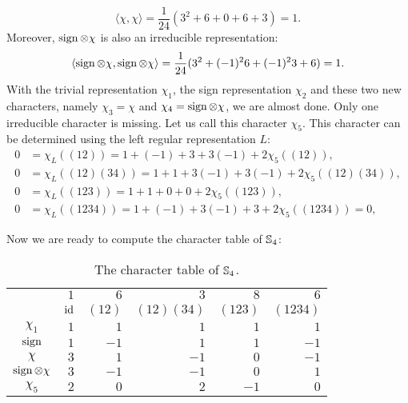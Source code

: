 \begin{example}
      \[
	 	\langle \chi,\chi\rangle=\frac{1}{24}(3^2+6+0+6+3)=1.
	 \]
     Moreover, $\operatorname{sign}\otimes\chi$ is also an irreducible representation:
     	\[
		\langle \operatorname{sign}\otimes\chi,\operatorname{sign}\otimes\chi\rangle=\frac{1}{24}(3^2+(-1)^26+(-1)^23+6)=1.
	\]
     With the trivial representation $\chi_1$, the sign representation $\chi_2$ and these two new characters, namely $\chi_3=\chi$ and $\chi_4=\operatorname{sign}\otimes\chi$, we are almost done. Only one irreducible character is missing. Let us call this
     character $\chi_5$. This character can be determined  
     using the left regular representation $L$: 
     \begin{align*}
		0 &= \chi_L\left( (12) \right)=1+(-1)+3+3(-1)+2\chi_5\left( (12) \right),\\
		0 &= \chi_L\left( (12)(34) \right)=1+1+3(-1)+3(-1)+2\chi_5\left( (12)(34) \right),\\
		0 &= \chi_L\left( (123) \right)=1+1+0+0+2\chi_5\left( (123) \right),\\
		0 &= \chi_L\left( (1234) \right)=1+(-1)+3(-1)+3+2\chi_5\left( (1234) \right)=0,
	\end{align*}
	
    Now we are ready to compute the character table of $\mathbb{S}_4$: 
    \begin{table}[ht]
    \caption{The character table of $\mathbb{S}_4$.}      
		\begin{tabular}{|c|rrrrr|}
			\hline
            & $1$ & $6$ & $3$ & $8$ & $6$\tabularnewline
			& $\operatorname{id}$ & $(12)$ & $(12)(34)$ & $(123)$ & $(1234)$\tabularnewline
			\hline
			$\chi_1$ & $1$ & $1$ & $1$ & $1$ & $1$\tabularnewline
			$\operatorname{sign}$ & $1$ & $-1$ & $1$ & $1$ & $-1$\tabularnewline
			$\chi$ & $3$ & $1$ & $-1$ & $0$ & $-1$\tabularnewline
			$\operatorname{sign}\otimes\chi$ & $3$ & $-1$ & $-1$ & $0$ & $1$\tabularnewline
			$\chi_5$ & $2$ & $0$ & $2$ & $-1$ & $0$\tabularnewline
			\hline
		\end{tabular}
	\end{table}
\end{example}


